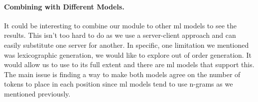 \documentclass[../Document.tex]{subfiles}
\begin{document}
\paragraph{Combining with Different Models.}
It could be interesting to combine our \cpbp module to other \gls{ml} models to see the results.
This isn't too hard to do as we use a server-client approach and can easily substitute one server for another.
In specific, one limitation we mentioned was lexicographic generation, we would like to explore out of order generation.
It would allow us to use \cp to its full extent and there are \gls{ml} models that support this.
The main issue is finding a way to make both models agree on the number of tokens to place in each position since \gls{ml} models tend to use n-grams as we mentioned previously.
\end{document}
